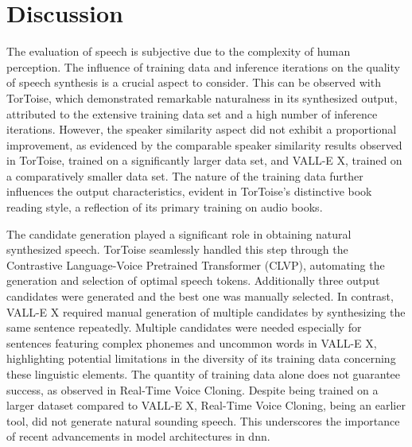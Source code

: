 \newpage
\section{Discussion}

The evaluation of speech is subjective due to the complexity of human perception. The influence of training data and inference iterations on the quality of speech synthesis is a crucial aspect to consider. This can be observed with TorToise, which demonstrated remarkable naturalness in its synthesized output, attributed to the extensive training data set and a high number of inference iterations. However, the speaker similarity aspect did not exhibit a proportional improvement, as evidenced by the comparable speaker similarity results observed in TorToise, trained on a significantly larger data set, and VALL-E X, trained on a comparatively smaller data set. The nature of the training data further influences the output characteristics, evident in TorToise's distinctive book reading style, a reflection of its primary training on audio books.

The candidate generation played a significant role in obtaining natural synthesized speech. TorToise seamlessly handled this step through the Contrastive Language-Voice Pretrained Transformer (CLVP), automating the generation and selection of optimal speech tokens. Additionally three output candidates were generated and the best one was manually selected. In contrast, VALL-E X required manual generation of multiple candidates by synthesizing the same sentence repeatedly. Multiple candidates were needed especially for sentences featuring complex phonemes and uncommon words in VALL-E X, highlighting potential limitations in the diversity of its training data concerning these linguistic elements.
The quantity of training data alone does not guarantee success, as observed in Real-Time Voice Cloning. Despite being trained on a larger dataset compared to VALL-E X, Real-Time Voice Cloning, being an earlier tool, did not generate natural sounding speech. This underscores the importance of recent advancements in model architectures in \gls{dnn}.


